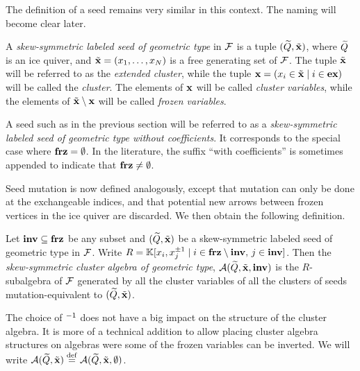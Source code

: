The definition of a seed remains very similar in this context. The naming will become
clear later.
\begin{definition}

	A \emph{skew-symmetric labeled seed of geometric type} in $\mathcal{F}$ is a tuple $(\widetilde{Q}, \tilde{\mathbf{x}})$, where $\widetilde{Q}$ is an ice quiver, and
	$\tilde{\mathbf{x}} = (x_1, \dots, x_N)$ is a free generating set of $\mathcal{F}$. The tuple $\tilde{\mathbf{x}}$ will be
	referred to as the \emph{extended cluster}, while the tuple
	$\mathbf{x} = (x_i \in \tilde{\mathbf{x}} \mid i \in \mathbf{ex})$ will be called the \emph{cluster}. The elements
	of $\mathbf{x}$ will be called \emph{cluster variables}, while the
	elements of $\tilde{\mathbf{x}} \setminus \mathbf{x}$ will be called \emph{frozen variables}.
\end{definition}

A seed such as in the previous section will be referred to as a \emph{skew-symmetric
	labeled seed of geometric type without coefficients}. It corresponds to the special
case where $\mathbf{frz} = \emptyset$. In the literature, the suffix ``with coefficients'' is
sometimes appended to indicate that $\mathbf{frz} \neq \emptyset$.

Seed mutation is now defined analogously, except that mutation can only be done at the
exchangeable indices, and that potential new arrows between frozen vertices in the ice
quiver are discarded. We then obtain the following definition.
\begin{definition}

	Let $\mathbf{inv} \subseteq \mathbf{frz}$ be any subset and $(\widetilde{Q}, \tilde{\mathbf{x}})$ be a skew-symmetric labeled
	seed of geometric type in $\mathcal{F}$. Write $R = \mathbb{K}[x_i, x_j^{\pm 1} \mid i \in \mathbf{frz}
		\setminus \mathbf{inv},\, j \in \mathbf{inv}]$. Then the \emph{skew-symmetric cluster algebra of
		geometric type}, $\mathcal{A}(\widetilde{Q},
		\tilde{\mathbf{x}}, \mathbf{inv})$ is the $R$-subalgebra of
	$\mathcal{F}$ generated by all the cluster variables of all the clusters of seeds
	mutation-equivalent to $(\widetilde{Q}, \tilde{\mathbf{x}})$.
\end{definition}

\begin{remark}

	The choice of $^{-1}$ does not have a big impact on the structure of the cluster
	algebra. It is more of a technical addition to allow placing cluster algebra structures
	on algebras were some of the frozen variables can be inverted. We will write $\mathcal{A}(\widetilde{Q},
		\tilde{\mathbf{x}}) \overset{\mathrm{def}}{=} \mathcal{A}(\widetilde{Q}, \tilde{\mathbf{x}}, \emptyset)$.
\end{remark}

